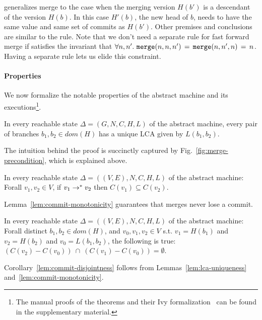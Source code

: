  generalizes merge to the case when the merging
version $H(b')$ is a descendant of the version $H(b)$. In this case
$H'(b)$, the new head of $b$, needs to have the same value and same
set of commits as $H(b')$. Other premises and conclusions are similar
to the  rule. Note that we don't need a separate rule
for fast forward merge if  satisfies the invariant that
$\forall n, n'.~ {\tt merge}(n,n,n') \,=\, {\tt merge}(n,n',n) \,=\, n$.
Having a separate rule lets us elide this constraint.

\paragraph{Properties} We now formalize the notable properties of the
abstract machine and its executions\footnote{
  The manual proofs of the theorems and their Ivy
  formalization~\cite{ivy} can be found in the supplementary material.
}. 

\begin{lemma}
  \label{lem:lca-uniqueness}
  In every reachable state $\Delta = (G,N,C,H,L)$ of the abstract
  machine, every pair of branches $b_1, b_2 \in dom(H)$ has a unique
  LCA given by $L(b_1,b_2)$.
\end{lemma}

The intuition behind the proof is succinctly captured by
Fig.~\ref{fig:merge-precondition}, which is explained above.

\begin{lemma}
  \label{lem:commit-monotonicity}
  In every reachable state $\Delta = ((V,E),N,C,H,L)$ of the abstract
  machine: Forall $v_1,v_2 \in V$, if $v_1 \rightarrow^{*} v_2$ then $C(v_1)
  \subseteq C(v_2)$.
\end{lemma}

Lemma~\ref{lem:commit-monotonicity} guarantees that merges never lose
a commit.

\begin{corollary}
  \label{lem:commit-disjointness}
  In every reachable state $\Delta = ((V,E),N,C,H,L)$ of the abstract
  machine: Forall distinct $b_1, b_2 \in dom(H)$, and $v_0, v_1, v_2
  \in V$ s.t.  $v_1 = H(b_1)$ and $v_2 = H(b_2)$ and $v_0 =
  L(b_1,b_2)$, the following is true: $(C(v_2) - C(v_0)) ~\cap~
  (C(v_1) - C(v_0)) = \emptyset$.
\end{corollary}

Corollary~\ref{lem:commit-disjointness} follows from
Lemmas~\ref{lem:lca-uniqueness} and~\ref{lem:commit-monotonicity}.

